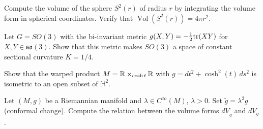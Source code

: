 \begin{exercise}
Compute the volume of the sphere $S^2(r)$ of radius $r$ by integrating the volume
form in spherical coordinates. Verify that $\operatorname{Vol}(S^2(r)) = 4\pi r^2$.
\end{exercise}

\begin{exercise}
Let $G = SO(3)$ with the bi-invariant metric $g(X, Y) = -\frac{1}{2}\mathrm{tr}(XY)$
for $X, Y \in \mathfrak{so}(3)$. Show that this metric makes $SO(3)$ a space
of constant sectional curvature $K = 1/4$.
\end{exercise}

\begin{exercise}
Show that the warped product $M = \mathbb{R} \times_{\cosh t} \mathbb{R}$ with
$g = dt^2 + \cosh^2(t)\, ds^2$ is isometric to an open subset of $\mathbb{H}^2$.
\end{exercise}

\begin{exercise}
Let $(M, g)$ be a Riemannian manifold and $\lambda \in C^\infty(M)$, $\lambda > 0$.
Set $\tilde{g} = \lambda^2 g$ (conformal change). Compute the relation between
the volume forms $dV_{\tilde{g}}$ and $dV_g$.
\end{exercise}
